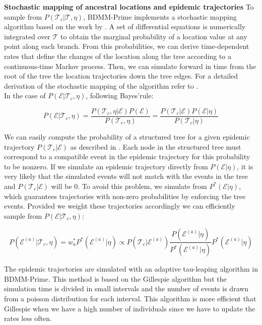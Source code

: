 \textbf{Stochastic mapping of ancestral locations and epidemic trajectories}
To sample from $P(\mathcal{T}_c|\mathcal{T}, \eta)$, BDMM-Prime implements a stochastic mapping algorithm based on the work by \cite{Hohna2019}. A set of differential equations is numerically integrated over $\mathcal{T}$ to obtain the marginal probability of a location value at any point along each branch. From this probabilities, we can derive time-dependent rates that define the changes of the location along the tree according to a continuous-time Markov process. Then, we can simulate forward in time from the root of the tree the location trajectories down the tree edges. For a detailed derivation of the stochastic mapping of the algorithm refer to \cite{VaughanWIP}.\\

In the case of $P(\mathcal{E}|\mathcal{T}_c, \eta)$, following Bayes'rule:

\begin{equation}
P(\mathcal{E}|\mathcal{T}_c, \eta) = \frac{P(\mathcal{T}_c, \eta|\mathcal{E}) P(\mathcal{E})}{P(\mathcal{T}_c, \eta)} = \frac{P(\mathcal{T}_c|\mathcal{E}) P(\mathcal{E}| \eta)}{P(\mathcal{T}_c | \eta)}
\label{trajectories}
\end{equation}

We can easily compute the probability of a structured tree for a given epidemic trajectory $P(\mathcal{T}_c|\mathcal{E})$ as described in \cite{Vaughan2019}. Each node in the structured tree must correspond to a compatible event in the epidemic trajectory for this probability to be nonzero. If we simulate an epidemic trajectory directly from $P(\mathcal{E}| \eta)$, it is very likely that the simulated events will not match with the events in the tree and $P(\mathcal{T}_c|\mathcal{E})$ will be 0. To avoid this problem, we simulate from $P^*(\mathcal{E}| \eta)$, which guarantees trajectories with non-zero probabilities by enforcing the tree events. Provided we weight these trajectories accordingly we can efficiently sample from $P(\mathcal{E}|\mathcal{T}_c, \eta)$:

\begin{equation}
P(\mathcal{E}^{(a)}|\mathcal{T}_c, \eta) = w_a^* P^*(\mathcal{E}^{(a)}| \eta) \propto P(\mathcal{T}_c | \mathcal{E}^{(a)}) \frac{P(\mathcal{E}^{(a)} | \eta)}{P^*(\mathcal{E}^{(a)} | \eta)} P^*(\mathcal{E}^{(a)}| \eta)
\label{eq:traj}
\end{equation}

The epidemic trajectories are simulated with an adaptive tau-leaping algorithm \cite{Gillespie2000} in BDMM-Prime. This method is based on the Gillespie algorithm \cite{Gillespie1977} but the simulation time is divided in small intervals and the number of events is drawn from a poisson distribution for each interval. This algorithm is more efficient that Gillespie when we have a high number of individuals since we have to update the rates less often. 

